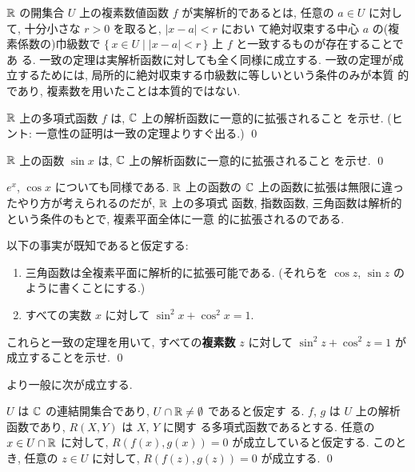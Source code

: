 \documentclass[12pt,twoside]{jarticle}
\begin{document}
\noindent ${\mathbb R}$ の開集合 $U$ 上の複素数値函数 $f$ が実解析的であるとは, 
任意の $a\in U$ に対して, 十分小さな $r>0$ を取ると, $|x-a|<r$ におい
て絶対収束する中心 $a$ の(複素係数の)巾級数で %
$\{\,x\in U \mid |x-a|<r\,\}$ 上 $f$ と一致するものが存在することであ
る. 一致の定理は実解析函数に対しても全く同様に成立する. 一致の定理が成
立するためには, 局所的に絶対収束する巾級数に等しいという条件のみが本質
的であり, 複素数を用いたことは本質的ではない.

\begin{question}
  ${\mathbb R}$ 上の多項式函数 $f$ は, ${\mathbb C}$ 上の解析函数に一意的に拡張されること
  を示せ. (ヒント: 一意性の証明は一致の定理よりすぐ出る.) \qed
\end{question}

\begin{question}
  ${\mathbb R}$ 上の函数 $\sin x$ は, ${\mathbb C}$ 上の解析函数に一意的に拡張されること
  を示せ. \qed
\end{question}

\noindent $e^x$, $\cos x$ についても同様である. ${\mathbb R}$ 上の函数の ${\mathbb C}$ 
上の函数に拡張は無限に違ったやり方が考えられるのだが, ${\mathbb R}$ 上の多項式
函数, 指数函数, 三角函数は解析的という条件のもとで, 複素平面全体に一意
的に拡張されるのである.

\begin{question}\qstar{*}
  以下の事実が既知であると仮定する:
  \begin{enumerate}
  \item 三角函数は全複素平面に解析的に拡張可能である. %
    (それらを $\cos z$, $\sin z$ のように書くことにする.)
  \item すべての実数 $x$ に対して $\sin^2 x + \cos^2 x = 1$.
  \end{enumerate}
  これらと一致の定理を用いて, すべての{\bf 複素数} $z$ に対して 
  $\sin^2 z + \cos^2 z = 1$ が成立することを示せ. \qed
\end{question}

\noindent より一般に次が成立する.

\begin{question}
  $U$ は ${\mathbb C}$ の連結開集合であり, $U\cap{\mathbb R}\ne\emptyset$ であると仮定す
  る.  $f$, $g$ は $U$ 上の解析函数であり, $R(X,Y)$ は $X$, $Y$ に関す
  る多項式函数であるとする. 任意の $x\in U\cap{\mathbb R}$ に対して,
  $R(f(x),g(x))=0$ が成立していると仮定する. このとき, 任意の $z\in U$ 
  に対して, $R(f(z),g(z))=0$ が成立する. \qed
\end{question}

\end{document}
